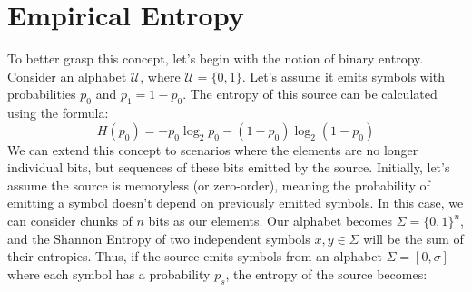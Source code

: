 
\section{Empirical Entropy}
To better grasp this concept, let's begin with the notion of binary entropy. Consider an alphabet $\mathcal{U}$, where $\mathcal{U} = \{0, 1\}$. Let's assume it emits symbols with probabilities $p_0$ and $p_1 = 1 - p_0$. The entropy of this source can be calculated using the formula:
\[
H(p_0) = -p_0 \log_2 p_0 - (1 - p_0) \log_2 (1 - p_0)
\]
We can extend this concept to scenarios where the elements are no longer individual bits, but sequences of these bits emitted by the source. Initially, let's assume the source is memoryless (or zero-order), meaning the probability of emitting a symbol doesn't depend on previously emitted symbols. In this case, we can consider chunks of $n$ bits as our elements. Our alphabet becomes $\Sigma = \{0, 1\}^n$, and the Shannon Entropy of two independent symbols $x, y \in \Sigma$ will be the sum of their entropies. Thus, if the source emits symbols from an alphabet $\Sigma = [0,\sigma]$ where each symbol has a probability $p_s$, the entropy of the source becomes:

